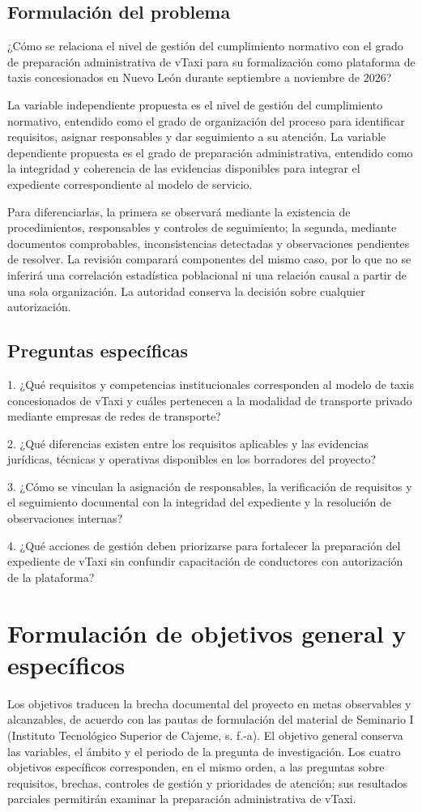 {\subsection{Formulación del problema}
¿Cómo se relaciona el nivel de gestión del cumplimiento normativo con el grado de preparación administrativa de vTaxi para su formalización como plataforma de taxis concesionados en Nuevo León durante septiembre a noviembre de 2026?


La variable independiente propuesta es el nivel de gestión del cumplimiento normativo, entendido como el grado de organización del proceso para identificar requisitos, asignar responsables y dar seguimiento a su atención. La variable dependiente propuesta es el grado de preparación administrativa, entendido como la integridad y coherencia de las evidencias disponibles para integrar el expediente correspondiente al modelo de servicio.


Para diferenciarlas, la primera se observará mediante la existencia de procedimientos, responsables y controles de seguimiento; la segunda, mediante documentos comprobables, inconsistencias detectadas y observaciones pendientes de resolver. La revisión comparará componentes del mismo caso, por lo que no se inferirá una correlación estadística poblacional ni una relación causal a partir de una sola organización. La autoridad conserva la decisión sobre cualquier autorización.


\subsection{Preguntas específicas}
1. ¿Qué requisitos y competencias institucionales corresponden al modelo de taxis concesionados de vTaxi y cuáles pertenecen a la modalidad de transporte privado mediante empresas de redes de transporte?


2. ¿Qué diferencias existen entre los requisitos aplicables y las evidencias jurídicas, técnicas y operativas disponibles en los borradores del proyecto?


3. ¿Cómo se vinculan la asignación de responsables, la verificación de requisitos y el seguimiento documental con la integridad del expediente y la resolución de observaciones internas?


4. ¿Qué acciones de gestión deben priorizarse para fortalecer la preparación del expediente de vTaxi sin confundir capacitación de conductores con autorización de la plataforma?


\section{Formulación de objetivos general y específicos}
Los objetivos traducen la brecha documental del proyecto en metas observables y alcanzables, de acuerdo con las pautas de formulación del material de Seminario I (Instituto Tecnológico Superior de Cajeme, s. f.-a). El objetivo general conserva las variables, el ámbito y el periodo de la pregunta de investigación. Los cuatro objetivos específicos corresponden, en el mismo orden, a las preguntas sobre requisitos, brechas, controles de gestión y prioridades de atención; sus resultados parciales permitirán examinar la preparación administrativa de vTaxi.


}
